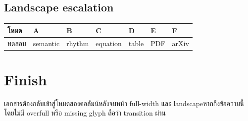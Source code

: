 \documentclass[10pt,a4paper,twocolumn]{article}
\begin{document}
\begin{FullWidthLandscape}
\section{Landscape escalation}
\begin{center}
\begin{ReadableTable}
\begin{tabularx}{\linewidth}{@{}lYYYYYY@{}}
\toprule
โหมด & A & B & C & D & E & F \\
\midrule
ทดสอบ & semantic & rhythm & equation & table & PDF & arXiv \\
\bottomrule
\end{tabularx}
\end{ReadableTable}
\end{center}
\end{FullWidthLandscape}

\section{Finish}
เอกสารต้องกลับเข้าสู่โหมดสองคอลัมน์หลังจบหน้า full-width และ landscape\ThaiBreath หากถึงข้อความนี้โดยไม่มี overfull หรือ missing glyph ถือว่า transition ผ่าน
\end{document}
